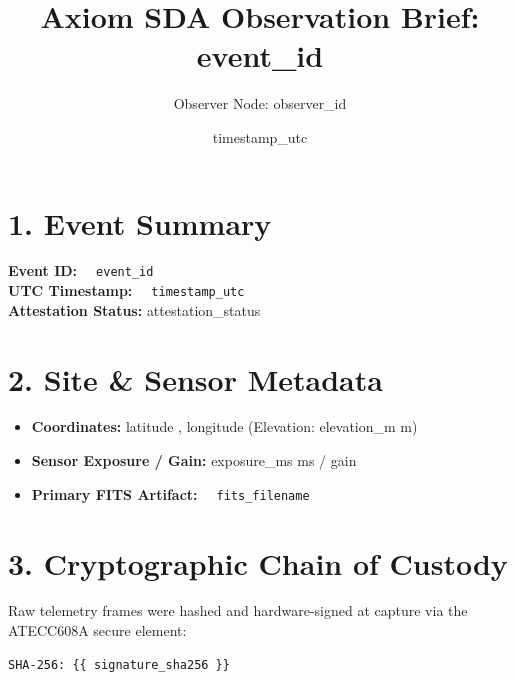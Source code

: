 \documentclass[11pt]{article}
\title{Axiom SDA Observation Brief: {{ event_id }}}
\author{Observer Node: {{ observer_id }}}
\date{ {{ timestamp_utc }} }
\begin{document}
\maketitle

\section*{1. Event Summary}
\textbf{Event ID:} \texttt{ {{ event_id }} } \\
\textbf{UTC Timestamp:} \texttt{ {{ timestamp_utc }} } \\
\textbf{Attestation Status:} {{ attestation_status }} \\


\section*{2. Site \& Sensor Metadata}
\begin{itemize}
  \item \textbf{Coordinates:} {{ latitude }}, {{ longitude }} (Elevation: {{ elevation_m }} m)
  \item \textbf{Sensor Exposure / Gain:} {{ exposure_ms }} ms / {{ gain }}
  \item \textbf{Primary FITS Artifact:} \texttt{ {{ fits_filename }} }
\end{itemize}

\section*{3. Cryptographic Chain of Custody}
Raw telemetry frames were hashed and hardware-signed at capture via the ATECC608A secure element:
\begin{verbatim}
SHA-256: {{ signature_sha256 }}
\end{verbatim}
\end{document}
